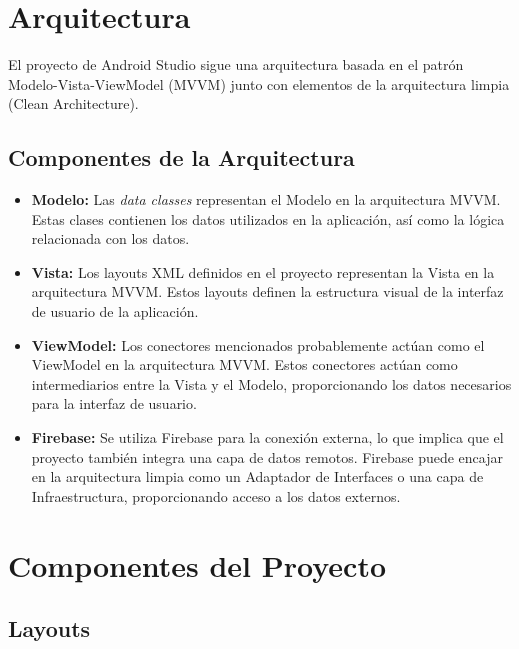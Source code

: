 \documentclass{article}
\begin{document}
\section{Arquitectura}

    El proyecto de Android Studio sigue una arquitectura basada en el patrón Modelo-Vista-ViewModel (MVVM) junto con elementos de la arquitectura limpia (Clean Architecture).

    \subsection{Componentes de la Arquitectura}

    \begin{itemize}
        \item \textbf{Modelo:} Las \emph{data classes} representan el Modelo en la arquitectura MVVM. Estas clases contienen los datos utilizados en la aplicación, así como la lógica relacionada con los datos.
        
        \item \textbf{Vista:} Los layouts XML definidos en el proyecto representan la Vista en la arquitectura MVVM. Estos layouts definen la estructura visual de la interfaz de usuario de la aplicación.
        
        \item \textbf{ViewModel:} Los conectores mencionados probablemente actúan como el ViewModel en la arquitectura MVVM. Estos conectores actúan como intermediarios entre la Vista y el Modelo, proporcionando los datos necesarios para la interfaz de usuario.
        
        \item \textbf{Firebase:} Se utiliza Firebase para la conexión externa, lo que implica que el proyecto también integra una capa de datos remotos. Firebase puede encajar en la arquitectura limpia como un Adaptador de Interfaces o una capa de Infraestructura, proporcionando acceso a los datos externos.
    \end{itemize}

\section{Componentes del Proyecto}

    \subsection{Layouts}
\end{document}
